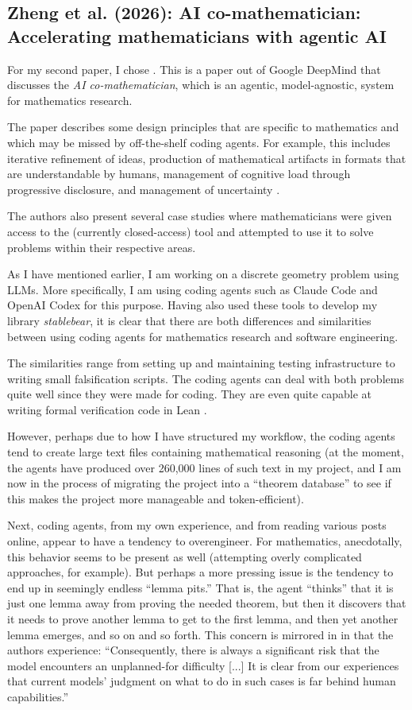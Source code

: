 \documentclass[a4paper,11pt]{article}
\begin{document}
\subsection{Zheng et al. (2026): AI co-mathematician: Accelerating
mathematicians with agentic AI}

For my second paper, I chose \cite{zheng2026ai}. This is a paper out of Google DeepMind that discusses the \emph{AI co-mathematician}, which is an agentic, model-agnostic, system for mathematics research. 

The paper describes some design principles that are specific to mathematics and which may be missed by off-the-shelf coding agents. For example, this includes iterative refinement of ideas, production of mathematical artifacts in formats that are understandable by humans, management of cognitive load through progressive disclosure, and management of uncertainty \cite{zheng2026ai}.

The authors also present several case studies where mathematicians were given access to the (currently closed-access) tool and attempted to use it to solve problems within their respective areas.

As I have mentioned earlier, I am working on a discrete geometry problem using LLMs. More specifically, I am using coding agents such as Claude Code and OpenAI Codex for this purpose. Having also used these tools to develop my library \emph{stablebear}, it is clear that there are both differences and similarities between using coding agents for mathematics research and software engineering.

The similarities range from setting up and maintaining testing infrastructure to writing small falsification scripts. The coding agents can deal with both problems quite well since they were made for coding. They are even quite capable at writing formal verification code in Lean \cite{lean}.

However, perhaps due to how I have structured my workflow, the coding agents tend to create large text files containing mathematical reasoning (at the moment, the agents have produced over 260,000 lines of such text in my project, and I am now in the process of migrating the project into a ``theorem database'' to see if this makes the project more manageable and token-efficient).

Next, coding agents, from my own experience, and from reading various posts online, appear to have a tendency to overengineer. For mathematics, anecdotally, this behavior seems to be present as well (attempting overly complicated approaches, for example). But perhaps a more pressing issue is the tendency to end up in seemingly endless ``lemma pits.'' That is, the agent ``thinks'' that it is just one lemma away from proving the needed theorem, but then it discovers that it needs to prove another lemma to get to the first lemma, and then yet another lemma emerges, and so on and so forth. This concern is mirrored in \cite{zheng2026ai} in that the authors experience: ``Consequently, there is always a significant risk that
the model encounters an unplanned-for difficulty [...] It is clear from our experiences that current models’ judgment on what
to do in such cases is far behind human capabilities.''
\end{document}
